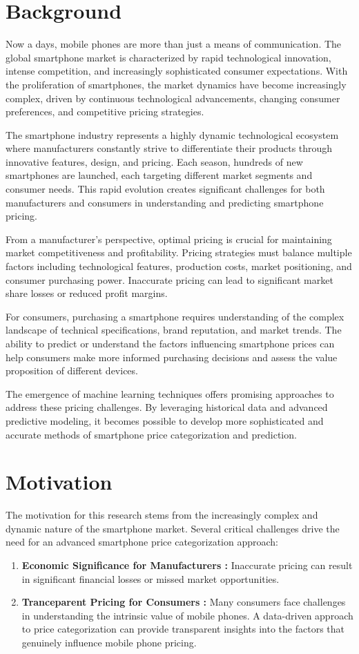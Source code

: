 \documentclass[12pt]{report}
\begin{document}
\section{Background}
Now a days, mobile phones are more than just a means of communication. The global smartphone market is characterized by rapid technological innovation, intense competition, and increasingly sophisticated consumer expectations. With the proliferation of smartphones, the market dynamics have become increasingly complex, driven by continuous technological advancements, changing consumer preferences, and competitive pricing strategies.

The smartphone industry represents a highly dynamic technological ecosystem where manufacturers constantly strive to differentiate their products through innovative features, design, and pricing. Each season, hundreds of new smartphones are launched, each targeting different market segments and consumer needs. This rapid evolution creates significant challenges for both manufacturers and consumers in understanding and predicting smartphone pricing.

From a manufacturer's perspective, optimal pricing is crucial for maintaining market competitiveness and profitability. Pricing strategies must balance multiple factors including technological features, production costs, market positioning, and consumer purchasing power. Inaccurate pricing can lead to significant market share losses or reduced profit margins.

For consumers, purchasing a smartphone requires understanding of the complex landscape of technical specifications, brand reputation, and market trends. The ability to predict or understand the factors influencing smartphone prices can help consumers make more informed purchasing decisions and assess the value proposition of different devices.

The emergence of machine learning techniques offers promising approaches to address these pricing challenges. By leveraging historical data and advanced predictive modeling, it becomes possible to develop more sophisticated and accurate methods of smartphone price categorization and prediction.
\section{Motivation}
The motivation for this research stems from the increasingly complex and dynamic nature of the smartphone market. Several critical challenges drive the need for an advanced smartphone price categorization approach:
\vspace{-1.25em}
\begin{enumerate}
	\setlength\itemsep{-1.05em}
	\item{\textbf{Economic Significance for Manufacturers :}} Inaccurate pricing can result in significant financial losses or missed market opportunities.
	\item{\textbf{Tranceparent Pricing for Consumers :}} Many consumers face challenges in understanding the intrinsic value of mobile phones. A data-driven approach to price categorization can provide transparent insights into the factors that genuinely influence mobile phone pricing.
\end{enumerate}
\end{document}
